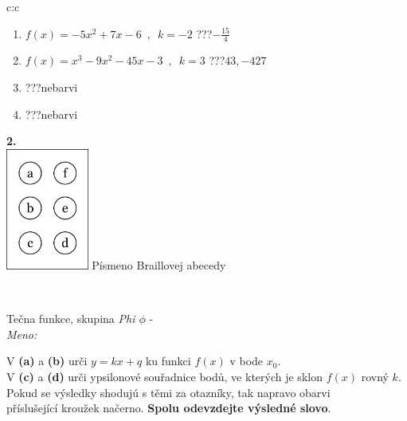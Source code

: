 \documentclass[10pt]{report}
\begin{document}
\begin{tabular}{c:c}
\begin{minipage}[c][104.5mm][t]{0.5\linewidth}
\begin{center}
\begin{minipage}{0.79\linewidth}
\begin{center}
\begin{varwidth}{\linewidth}
\begin{enumerate}
\item $f(x)=-5x^2+7x-6\enspace , \enspace k=-2$\quad \dotfill\; ???\;\dotfill \quad $-\frac{15}{4}$
\item $f(x)=x^3-9x^2-45x-3\enspace , \enspace k=3$\quad \dotfill\; ???\;\dotfill \quad $43 , -427$
\item \quad \dotfill\; ???\;\dotfill \quad nebarvi
\item \quad \dotfill\; ???\;\dotfill \quad nebarvi
\end{enumerate}
\end{varwidth}
\end{center}
\end{minipage}
\begin{minipage}{0.20\linewidth}
\begin{center}
{\Huge\bfseries 2.} \\[2mm]
\includegraphics[height=40mm]{../images/braille.png}
{\small Písmeno Braillovej abecedy}
\end{center}
\end{minipage}
\end{center}
\end{minipage}
\\ \hdashline
\begin{minipage}[c][104.5mm][t]{0.5\linewidth}
\begin{center}
\vspace{7mm}
{\huge Tečna funkce, skupina \textit{Phi $\phi$} -}\\[5mm]
\textit{Meno:}\phantom{xxxxxxxxxxxxxxxxxxxxxxxxxxxxxxxxxxxxxxxxxxxxxxxxxxxxxxxxxxxxxxxxx}\\[5mm]
\begin{minipage}{0.95\linewidth}
\begin{center}
V \textbf{(a)} a \textbf{(b)} urči  $y = kx + q$ ku funkci $f(x)$ v bode $x_0$.\\V \textbf{(c)} a \textbf{(d)} urči ypsilonové souřadnice bodů, ve kterých je sklon $f(x)$ rovný $k$.\\Pokud se výsledky shodujú s těmi za otazníky, tak napravo obarvi\\příslušející kroužek načerno. \textbf{Spolu odevzdejte výsledné slovo}.

\end{center}
\end{minipage}
\end{center}
\end{minipage}
\end{tabular}
\end{document}
